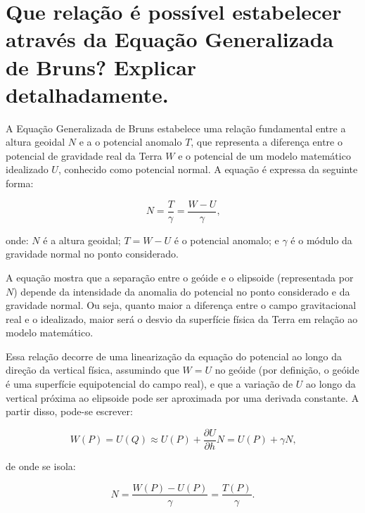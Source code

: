 
\section{Que relação é possível estabelecer através da Equação Generalizada de Bruns? Explicar detalhadamente.}

A Equação Generalizada de Bruns estabelece uma relação fundamental entre a altura geoidal \( N \) e a o potencial anomalo \( T \), que representa a diferença entre o potencial de gravidade real da Terra \( W \) e o potencial de um modelo matemático idealizado \( U \), conhecido como potencial normal. A equação é expressa da seguinte forma:

\[
N = \frac{T}{\gamma} = \frac{W - U}{\gamma} \text{,}
\]

\noindent
onde: \( N \) é a altura geoidal; \( T = W - U \) é o potencial anomalo; e \( \gamma \) é o módulo da gravidade normal no ponto considerado.


A equação mostra que a separação entre o geóide e o elipsoide (representada por \( N \)) depende da intensidade da anomalia do potencial no ponto considerado e da gravidade normal. Ou seja, quanto maior a diferença entre o campo gravitacional real e o idealizado, maior será o desvio da superfície física da Terra em relação ao modelo matemático.

Essa relação decorre de uma linearização da equação do potencial ao longo da direção da vertical física, assumindo que \( W = U \) no geóide (por definição, o geóide é uma superfície equipotencial do campo real), e que a variação de \( U \) ao longo da vertical próxima ao elipsoide pode ser aproximada por uma derivada constante. A partir disso, pode-se escrever:

\[
W(P) = U(Q) \approx U(P) + \frac{\partial U}{\partial h} N = U(P) + \gamma N \text{,}
\]

\noindent
de onde se isola:

\[
N = \frac{W(P) - U(P)}{\gamma} = \frac{T(P)}{\gamma} \text{.}
\]



